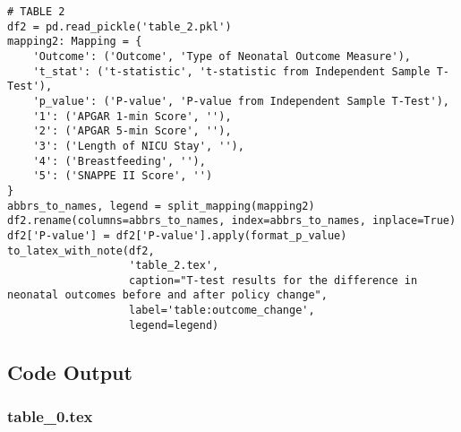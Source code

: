 \documentclass[11pt]{article}
\begin{document}
\begin{verbatim}
# TABLE 2
df2 = pd.read_pickle('table_2.pkl')
mapping2: Mapping = {
    'Outcome': ('Outcome', 'Type of Neonatal Outcome Measure'),
    't_stat': ('t-statistic', 't-statistic from Independent Sample T-Test'),
    'p_value': ('P-value', 'P-value from Independent Sample T-Test'),
    '1': ('APGAR 1-min Score', ''),
    '2': ('APGAR 5-min Score', ''),
    '3': ('Length of NICU Stay', ''),
    '4': ('Breastfeeding', ''),
    '5': ('SNAPPE II Score', '')
}
abbrs_to_names, legend = split_mapping(mapping2)
df2.rename(columns=abbrs_to_names, index=abbrs_to_names, inplace=True)
df2['P-value'] = df2['P-value'].apply(format_p_value)
to_latex_with_note(df2,
                   'table_2.tex', 
                   caption="T-test results for the difference in neonatal outcomes before and after policy change", 
                   label='table:outcome_change',
                   legend=legend)

\end{verbatim}



\subsection{Code Output}

\subsubsection*{table\_0.tex}
\end{document}
